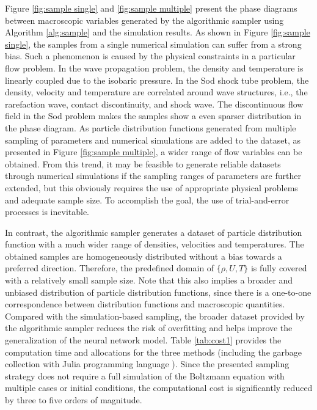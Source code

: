 \documentclass[preprint,3p,12pt,sort&compress]{elsarticle}
\begin{document}
Figure \ref{fig:sample single} and \ref{fig:sample multiple} present the phase diagrams between macroscopic variables generated by the algorithmic sampler using Algorithm \ref{alg:sample} and the simulation results.
As shown in Figure \ref{fig:sample single}, the samples from a single numerical simulation can suffer from a strong bias.
Such a phenomenon is caused by the physical constraints in a particular flow problem.
In the wave propagation problem, the density and temperature is linearly coupled due to the isobaric pressure.
In the Sod shock tube problem, the density, velocity and temperature are correlated around wave structures, i.e., the rarefaction wave, contact discontinuity, and shock wave.
The discontinuous flow field in the Sod problem makes the samples show a even sparser distribution in the phase diagram.
As particle distribution functions generated from multiple sampling of parameters and numerical simulations are added to the dataset, as presented in Figure \ref{fig:sample multiple}, a wider range of flow variables can be obtained.
From this trend, it may be feasible to generate reliable datasets through numerical simulations if the sampling ranges of parameters are further extended, but this obviously requires the use of appropriate physical problems and adequate sample size.
To accomplish the goal, the use of trial-and-error processes is inevitable.

In contrast, the algorithmic sampler generates a dataset of particle distribution function with a much wider range of densities, velocities and temperatures.
The obtained samples are homogeneously distributed without a bias towards a preferred direction.
Therefore, the predefined domain of $\{\rho,U,T\}$ is fully covered with a relatively small sample size.
Note that this also implies a broader and unbiased distribution of particle distribution functions, since there is a one-to-one correspondence between distribution functions and macroscopic quantities.
Compared with the simulation-based sampling, the broader dataset provided by the algorithmic sampler reduces the risk of overfitting and helps improve the generalization of the neural network model.
Table \ref{tab:cost1} provides the computation time and allocations for the three methods (including the garbage collection with Julia programming language \cite{abelson1996structure}).
Since the presented sampling strategy does not require a full simulation of the Boltzmann equation with multiple cases or initial conditions, the computational cost is significantly reduced by three to five orders of magnitude.
\end{document}
